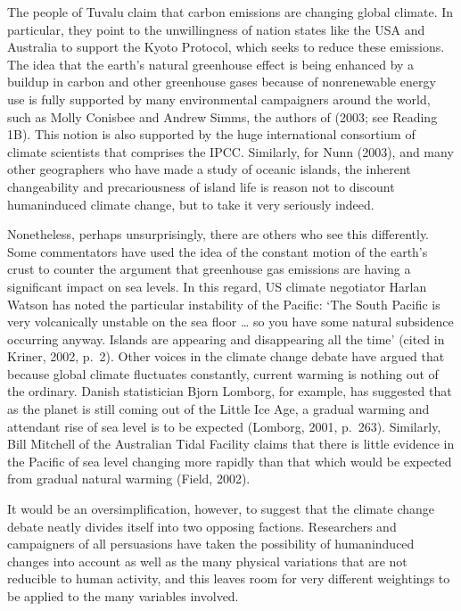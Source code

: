 \documentclass[letterpaper,10pt,english]{sphinxmanual}
\begin{document}
The people of Tuvalu claim that carbon emissions are changing global climate. In particular, they point to the unwillingness of nation states like the USA and Australia to support the Kyoto Protocol, which seeks to reduce these emissions. The idea that the earth’s natural greenhouse effect is being enhanced by a build\sphinxhyphen{}up in carbon and other greenhouse gases because of non\sphinxhyphen{}renewable energy use is fully supported by many environmental campaigners around the world, such as Molly Conisbee and Andrew
Simms, the authors of  (2003; see Reading 1B). This notion is also supported by the huge international consortium of climate scientists that comprises the IPCC. Similarly, for Nunn (2003), and many other geographers who have made a study of oceanic islands, the inherent changeability and precariousness of island life is reason not to discount human\sphinxhyphen{}induced climate change, but to take it very seriously indeed.

Nonetheless, perhaps unsurprisingly, there are others who see this differently. Some commentators have used the idea of the constant motion of the earth’s crust to counter the argument that greenhouse gas emissions are having a significant impact on sea levels. In this regard, US climate negotiator Harlan Watson has noted the particular instability of the Pacific: ‘The South Pacific is very volcanically unstable on the sea floor … so you have some natural subsidence occurring anyway. Islands are
appearing and disappearing all the time’ (cited in Kriner, 2002, p. 2). Other voices in the climate change debate have argued that because global climate fluctuates constantly, current warming is nothing out of the ordinary. Danish statistician Bjorn Lomborg, for example, has suggested that as the planet is still coming out of the Little Ice Age, a gradual warming and attendant rise of sea level is to be expected (Lomborg, 2001, p. 263). Similarly, Bill Mitchell of the Australian Tidal Facility
claims that there is little evidence in the Pacific of sea level changing more rapidly than that which would be expected from gradual natural warming (Field, 2002).

It would be an oversimplification, however, to suggest that the climate change debate neatly divides itself into two opposing factions. Researchers and campaigners of all persuasions have taken the possibility of human\sphinxhyphen{}induced changes into account as well as the many physical variations that are not reducible to human activity, and this leaves room for very different weightings to be applied to the many variables involved.
\end{document}
